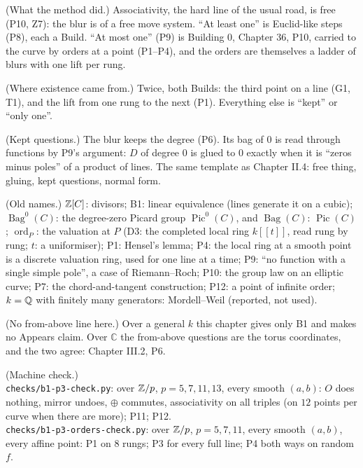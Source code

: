 \begin{lines}
\item[\lab{R1}] (What the method did.) Associativity, the hard line of the usual road, is free (P10, Z7): the blur is of a free move system. ``At least one'' is Euclid-like steps (P8), each a Build. ``At most one'' (P9) is Building 0, Chapter 36, P10, carried to the curve by orders at a point (P1--P4), and the orders are themselves a ladder of blurs with one lift per rung.
\item[\lab{R2}] (Where existence came from.) Twice, both Builds: the third point on a line (G1, T1), and the lift from one rung to the next (P1). Everything else is ``kept'' or ``only one''.
\item[\lab{R3}] (Kept questions.) The blur keeps the degree (P6). Its bag of $0$ is read through functions by P9's argument: $D$ of degree $0$ is glued to $0$ exactly when it is ``zeros minus poles'' of a product of lines. The same template as Chapter II.4: free thing, gluing, kept questions, normal form.
\item[\lab{R4}] (Old names.) $\mathbb{Z}[C]$: divisors; B1: linear equivalence (lines generate it on a cubic); $\operatorname{Bag}^0(C)$: the degree-zero Picard group $\operatorname{Pic}^0(C)$, and $\operatorname{Bag}(C)$: $\operatorname{Pic}(C)$; $\operatorname{ord}_P$: the valuation at $P$ (D3: the completed local ring $k[[t]]$, read rung by rung; $t$: a uniformiser); P1: Hensel's lemma; P4: the local ring at a smooth point is a discrete valuation ring, used for one line at a time; P9: ``no function with a single simple pole'', a case of Riemann--Roch; P10: the group law on an elliptic curve; P7: the chord-and-tangent construction; P12: a point of infinite order; $k = \mathbb{Q}$ with finitely many generators: Mordell--Weil (reported, not used).
\item[\lab{R5}] (No from-above line here.) Over a general $k$ this chapter gives only B1 and makes no Appears claim. Over $\mathbb{C}$ the from-above questions are the torus coordinates, and the two agree: Chapter III.2, P6.
\item[\lab{R6}] (Machine check.) \\ \texttt{checks/b1-p3-check.py}: over $\mathbb{Z}/p$, $p = 5, 7, 11, 13$, every smooth $(a, b)$: $O$ does nothing, mirror undoes, $\oplus$ commutes, associativity on all triples (on $12$ points per curve when there are more); P11; P12. \\ \texttt{checks/b1-p3-orders-check.py}: over $\mathbb{Z}/p$, $p = 5, 7, 11$, every smooth $(a, b)$, every affine point: P1 on $8$ rungs; P3 for every full line; P4 both ways on random $f$.
\end{lines}

